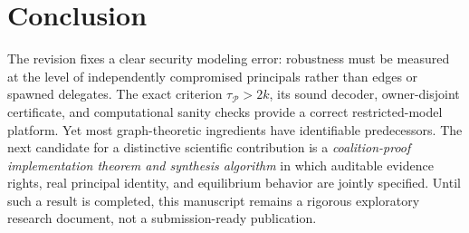 \documentclass[10pt,a4paper]{article}
\theoremstyle{definition}\newtheorem{definition}[theorem]{Definition}
\newcommand{\Princ}{\mathcal P}
\begin{document}
\section{Conclusion}
The revision fixes a clear security modeling error: robustness must be measured at the level of independently compromised principals rather than edges or spawned delegates. The exact criterion $\tau_{\Princ}>2k$, its sound decoder, owner-disjoint certificate, and computational sanity checks provide a correct restricted-model platform. Yet most graph-theoretic ingredients have identifiable predecessors. The next candidate for a distinctive scientific contribution is a \emph{coalition-proof implementation theorem and synthesis algorithm} in which auditable evidence rights, real principal identity, and equilibrium behavior are jointly specified. Until such a result is completed, this manuscript remains a rigorous exploratory research document, not a submission-ready publication.
\end{document}
